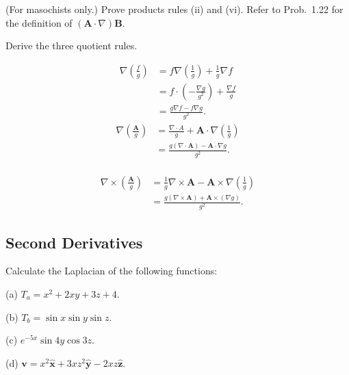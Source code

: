             \begin{prob}[1.23](For masochists only.) Prove products rules (ii) and (vi). Refer to Prob.~1.22 for the definition of $(\mathbf{A}\cdot\nabla)\mathbf{B}$.
            \end{prob}

            \begin{prob}[1.24] Derive the three quotient rules.
            \end{prob}

            \begin{sol}[1.24]
                \begin{equation}
                    \begin{aligned}
                        \nabla\left(\frac{f}{g}\right)&=f\nabla\left(\frac{1}{g}\right) + \frac{1}{g}\nabla f \\
                        &=f\cdot\left(-\frac{\nabla g}{g^2}\right) + \frac{\nabla f}{g} \\
                        &=\frac{g\nabla f - f\nabla g}{g^2}.
                    \end{aligned}
                \end{equation}
                \begin{equation}
                    \begin{aligned}
                        \nabla\left(\frac{\mathbf{A}}{g}\right) &= \frac{\nabla \cdot A}{g} + \mathbf{A}\cdot \nabla \left(\frac{1}{g}\right) \\
                        &=\frac{g\left(\nabla\cdot\mathbf{A}\right)-\mathbf{A}\cdot\nabla g}{g^2}.
                    \end{aligned}
                \end{equation}~\\
                \begin{equation}
                    \begin{aligned}
                        \nabla\times\left(\frac{\mathbf{A}}{g}\right) &= \frac{1}{g} \nabla\times\mathbf{A} - \mathbf{A} \times \nabla\left(\frac{1}{g}\right) \\
                        &=\frac{g(\nabla\times\mathbf{A}) + \mathbf{A}\times(\nabla g)}{g^2}.
                    \end{aligned}
                \end{equation}
            \end{sol}
    \subsection{Second Derivatives}
        \begin{prob}[1.26] Calculate the Laplacian of the following functions:

            \noindent (a) $T_a = x^2 + 2xy + 3z + 4$.
            
            \noindent (b) $T_b = \sin x \sin y \sin z$.

            \noindent (c) $e^{-5x} \sin 4y \cos 3z$.

            \noindent (d) $\mathbf{v} = x^2\mathbf{\hat{x}} + 3xz^2\mathbf{\hat{y}} - 2xz\mathbf{\hat{z}}$.
        \end{prob}

